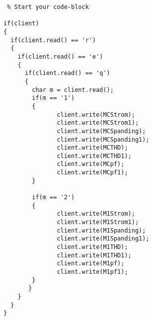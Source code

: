 \begin{lstlisting} % Start your code-block

if(client)
{
  if(client.read() == 'r')
  {
    if(client.read() == 'e')
    {
  	  if(client.read() == 'q')
	  {
		char m = client.read();
		if(m == '1')
		{
		       client.write(MCStrom);
		       client.write(MCStrom1);
		       client.write(MCSpanding);
		       client.write(MCSpanding1);
		       client.write(MCTHD);
		       client.write(MCTHD1);
		       client.write(MCpf);
		       client.write(MCpf1);
		}
			           
		if(m == '2')
		{
		       client.write(M1Strom);
		       client.write(M1Strom1);
		       client.write(M1Spanding);
		       client.write(M1Spanding1);
		       client.write(M1THD);
		       client.write(M1THD1);
		       client.write(M1pf);
		       client.write(M1pf1); 
		}
	   }	
    }    
  }
}				
\end{lstlisting}

